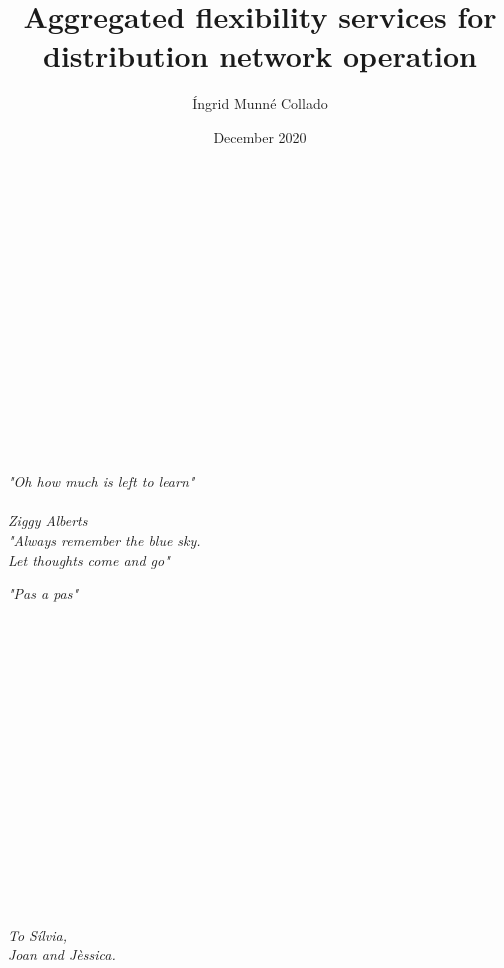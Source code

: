 \documentclass{Classe/PhDCITCEA_web}
\title{Aggregated flexibility services for distribution network operation}
\author{\'Ingrid Munn\'e Collado}
\date{December 2020}
\begin{document}
\cleardoubleemptypage


\maketitle

\cleardoubleemptypage

%

\clearpage
$ $
\\$ $
\\$ $
\\$ $
\\$ $
\\$ $
\\$ $
\\$ $
\\$ $
\\$ $
\\$ $
\\$ $
\\$ $

\begin{Large}
{\raggedleft
\textit{"Oh how much is left to learn"\\ ~ \\ Ziggy Alberts\\}}
\vspace{2cm}
\vspace{2cm}
{\raggedleft
	\textit{"Always remember the blue sky. \\ Let thoughts come and go"\\}}

\vspace{2cm}
{\raggedleft
	\textit{"Pas a pas"\\}}

\end{Large}
\clearpage
$~$
$~$
\clearpage
$ $
\\$ $
\\$ $
\\$ $
\\$ $
\\$ $
\\$ $
\\$ $
\\$ $
\\$ $
\\$ $
\\$ $
\\$ $
\\$ $
\\$ $
\begin{Large}
	{\raggedleft
		\textit{To S\'ilvia,\\ Joan and J\`essica.\\}
		}
\end{Large}
\end{document}
